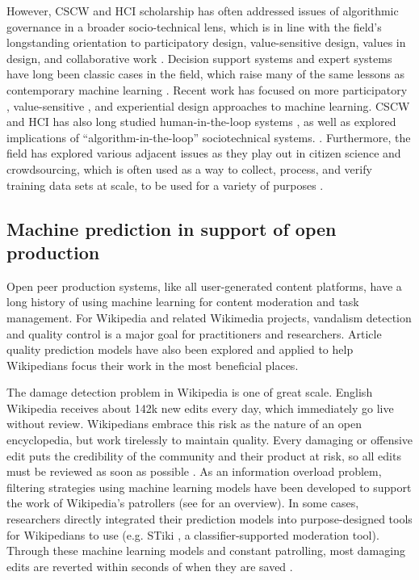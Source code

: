 However, CSCW and HCI scholarship has often addressed issues of algorithmic governance in a broader socio-technical lens, which is in line with the field's longstanding orientation to participatory design, value-sensitive design, values in design, and collaborative work \cite{friedman1996value,friedman1996bias,schmidt1992taking,harrison2007,schuler1993}. Decision support systems and expert systems have long been classic cases in the field, which raise many of the same lessons as contemporary machine learning \cite{bentley1992,star1994steps,lynch2004user}. Recent work has focused on more participatory \cite{lee2019webuildai}, value-sensitive \cite{zhu2018value}, and experiential design \cite{alvarado2018towards} approaches to machine learning. CSCW and HCI has also long studied human-in-the-loop systems \cite{zhang2017,choe2014,geiger2010work}, as well as explored implications of ``algorithm-in-the-loop'' sociotechnical systems. \cite{green2019principles}. Furthermore, the field has explored various adjacent issues as they play out in citizen science and crowdsourcing, which is often used as a way to collect, process, and verify training data sets at scale, to be used for a variety of purposes \cite{wiggins2011conservation,harandi2018,kittur2013future}.

\subsection{Machine prediction in support of open production}
Open peer production systems, like all user-generated content platforms, have a long history of using machine learning for content moderation and task management. For Wikipedia and related Wikimedia projects, vandalism detection and quality control is a major goal for practitioners and researchers.  Article quality prediction models have also been explored and applied to help Wikipedians focus their work in the most beneficial places.

 The damage detection problem in Wikipedia is one of great scale.  English Wikipedia receives about 142k new edits every day, which immediately go live without review.  Wikipedians embrace this risk as the nature of an open encyclopedia, but work tirelessly to maintain quality. Every damaging or offensive edit puts the credibility of the community and their product at risk, so all edits must be reviewed as soon as possible \cite{geiger2010work}. As an information overload problem, filtering strategies using machine learning models have been developed to support the work of Wikipedia's patrollers (see \cite{adler2011wikipedia} for an overview).  In some cases, researchers directly integrated their prediction models into purpose-designed tools for Wikipedians to use (e.g. STiki \cite{west2010stiki}, a classifier-supported moderation tool). Through these machine learning models and constant patrolling, most damaging edits are reverted within seconds of when they are saved \cite{geiger2013levee}.

